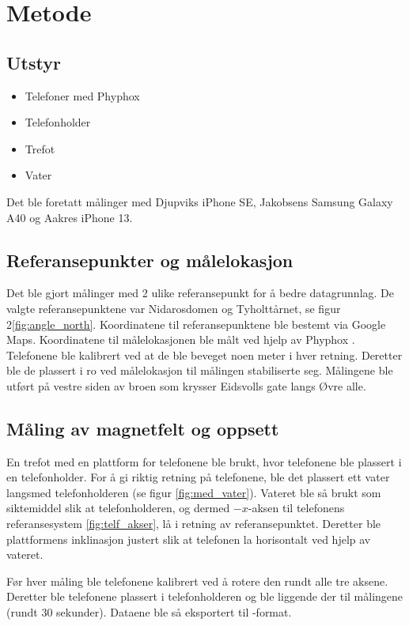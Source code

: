 \section{Metode}
\subsection{Utstyr}
\begin{itemize}
    \item Telefoner med Phyphox
    \item Telefonholder
    \item Trefot
    \item Vater
\end{itemize}
Det ble foretatt målinger med Djupviks iPhone SE, Jakobsens Samsung Galaxy A40 og Aakres iPhone 13. 

\subsection{Referansepunkter og målelokasjon}
Det ble gjort målinger med 2 ulike referansepunkt for å bedre datagrunnlag. De valgte referansepunktene var Nidarosdomen og Tyholttårnet, se figur 2\ref{fig:angle_north}. Koordinatene til referansepunktene ble bestemt via Google Maps. Koordinatene til målelokasjonen ble målt ved hjelp av Phyphox \cite{phyphox}. Telefonene ble kalibrert ved at de ble beveget noen meter i hver retning. Deretter ble de plassert i ro ved målelokasjon til målingen stabiliserte seg. Målingene ble utført på vestre siden av broen som krysser Eidsvolls gate langs Øvre alle. 


\subsection{Måling av magnetfelt og oppsett}
En trefot med en plattform for telefonene ble brukt, hvor telefonene ble plassert i en telefonholder. For å gi riktig retning på telefonene, ble det plassert ett vater langsmed telefonholderen (se figur \ref{fig:med_vater}). Vateret ble så brukt som siktemiddel slik at telefonholderen, og dermed $-x$-aksen til telefonens referansesystem \ref{fig:telf_akser}, lå i retning av referansepunktet. Deretter ble plattformens inklinasjon justert slik at telefonen la horisontalt ved hjelp av vateret.

Før hver måling ble telefonene kalibrert ved å rotere den rundt alle tre aksene. Deretter ble telefonene plassert i telefonholderen og ble liggende der til målingene (rundt $30$ sekunder). Dataene ble så eksportert til -format. 

